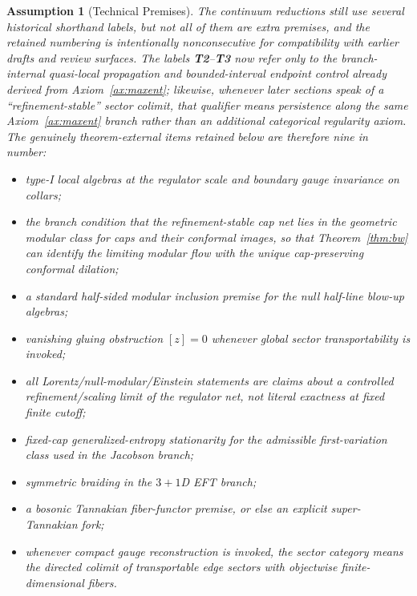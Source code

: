\documentclass[11pt]{article}
\newtheorem{assumption}[theorem]{Assumption}
\begin{document}
\begin{assumption}[Technical Premises]\label{ass:technical}
The continuum reductions still use several historical shorthand labels, but not all of them are extra premises, and the retained numbering is intentionally nonconsecutive for compatibility with earlier drafts and review surfaces. The labels \textbf{T2}--\textbf{T3} now refer only to the branch-internal quasi-local propagation and bounded-interval endpoint control already derived from Axiom~\ref{ax:maxent}; likewise, whenever later sections speak of a ``refinement-stable'' sector colimit, that qualifier means persistence along the same Axiom~\ref{ax:maxent} branch rather than an additional categorical regularity axiom. The genuinely theorem-external items retained below are therefore nine in number:
\begin{itemize}[leftmargin=2.3em]
\item[\textbf{T1}] type-I local algebras at the regulator scale and boundary gauge invariance on collars;
\item[\textbf{T4}] the branch condition that the refinement-stable cap net lies in the geometric modular class for caps and their conformal images, so that Theorem~\ref{thm:bw} can identify the limiting modular flow with the unique cap-preserving conformal dilation;
\item[\textbf{T6}] a standard half-sided modular inclusion premise for the null half-line blow-up algebras;
\item[\textbf{T7}] vanishing gluing obstruction \([z]=0\) whenever global sector transportability is invoked;
\item[\textbf{T8}] all Lorentz/null-modular/Einstein statements are claims about a controlled refinement/scaling limit of the regulator net, not literal exactness at fixed finite cutoff;
\item[\textbf{T9}] fixed-cap generalized-entropy stationarity for the admissible first-variation class used in the Jacobson branch;
\item[\textbf{T10}] symmetric braiding in the \(3+1\)D EFT branch;
\item[\textbf{T11}] a bosonic Tannakian fiber-functor premise, or else an explicit super-Tannakian fork;
\item[\textbf{T12}] whenever compact gauge reconstruction is invoked, the sector category means the directed colimit of transportable edge sectors with objectwise finite-dimensional fibers.
\end{itemize}
\end{assumption}
\end{document}
